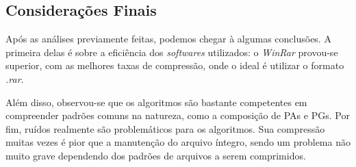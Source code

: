 \subsection{Considerações Finais}
Após as análises previamente feitas, podemos chegar à algumas conclusões. A primeira delas é sobre a eficiência dos \textit{softwares} utilizados: o \textit{WinRar} provou-se superior, com as melhores taxas de compressão, onde o ideal é utilizar o formato \textit{.rar}.

\hspace{1.5 cm} Além disso, observou-se que os algoritmos são bastante competentes em compreender padrões comuns na natureza, como a composição de PAs e PGs. Por fim, ruídos realmente são problemáticos para os algoritmos. Sua compressão muitas vezes é pior que a manutenção do arquivo íntegro, sendo um problema não muito grave dependendo dos padrões de arquivos a serem comprimidos.
